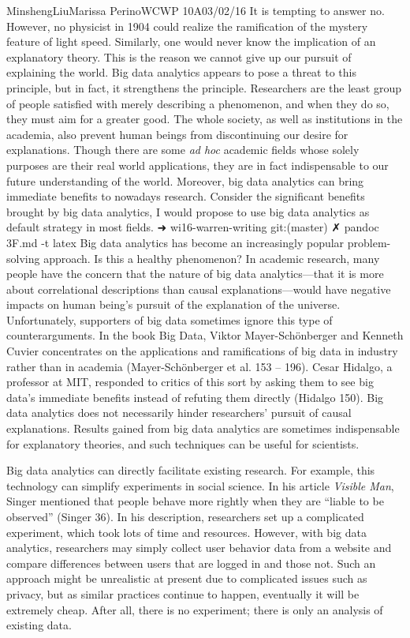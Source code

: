 \documentclass[12pt,letterpaper]{article}
\begin{document}
\begin{mla}{Minsheng}{Liu}{Marissa Perino}{WCWP 10A}{03/02/16}
It is tempting to answer no. However, no physicist in 1904 could realize
the ramification of the mystery feature of light speed. Similarly, one
would never know the implication of an explanatory theory. This is the
reason we cannot give up our pursuit of explaining the world. Big data
analytics appears to pose a threat to this principle, but in fact, it
strengthens the principle. Researchers are the least group of people
satisfied with merely describing a phenomenon, and when they do so, they
must aim for a greater good. The whole society, as well as institutions
in the academia, also prevent human beings from discontinuing our desire
for explanations. Though there are some \emph{ad hoc} academic fields
whose solely purposes are their real world applications, they are in
fact indispensable to our future understanding of the world. Moreover,
big data analytics can bring immediate benefits to nowadays research.
Consider the significant benefits brought by big data analytics, I would
propose to use big data analytics as default strategy in most fields.
➜  wi16-warren-writing git:(master) ✗ pandoc 3F.md -t latex
Big data analytics has become an increasingly popular problem-solving
approach. Is this a healthy phenomenon? In academic research, many
people have the concern that the nature of big data analytics---that it
is more about correlational descriptions than causal
explanations---would have negative impacts on human being's pursuit of
the explanation of the universe. Unfortunately, supporters of big data
sometimes ignore this type of counterarguments. In the book Big Data,
Viktor Mayer-Schönberger and Kenneth Cuvier concentrates on the
applications and ramifications of big data in industry rather than in
academia (Mayer-Schönberger et al. 153 -- 196). Cesar Hidalgo, a
professor at MIT, responded to critics of this sort by asking them to
see big data's immediate benefits instead of refuting them directly
(Hidalgo 150). Big data analytics does not necessarily hinder
researchers' pursuit of causal explanations. Results gained from big
data analytics are sometimes indispensable for explanatory theories, and
such techniques can be useful for scientists.

Big data analytics can directly facilitate existing research. For
example, this technology can simplify experiments in social science. In
his article \emph{Visible Man}, Singer mentioned that people behave more
rightly when they are ``liable to be observed'' (Singer 36). In his
description, researchers set up a complicated experiment, which took
lots of time and resources. However, with big data analytics,
researchers may simply collect user behavior data from a website and
compare differences between users that are logged in and those not. Such
an approach might be unrealistic at present due to complicated issues
such as privacy, but as similar practices continue to happen, eventually
it will be extremely cheap. After all, there is no experiment; there is
only an analysis of existing data.


\end{mla}
\end{document}
